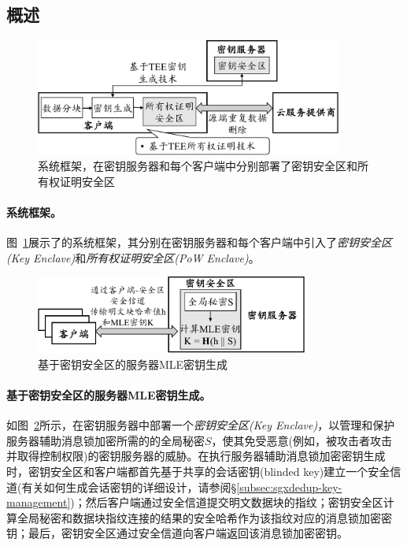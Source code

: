 \subsection{概述}
\label{subsec:sgxdedup-arch}

\begin{figure}[!htb]
  \centering
  \includegraphics[width=0.9\textwidth]{pic/sgxdedup/sgxdedup-arch.pdf}
  \caption{\sysnameS 系统框架，在密钥服务器和每个客户端中分别部署了密钥安全区和所有权证明安全区}
  \label{fig:sgxdedup-overview}
\end{figure}

\paragraph*{\sysnameS 系统框架。}图~\ref{fig:sgxdedup-overview}展示了\sysnameS 的系统框架，其分别在密钥服务器和每个客户端中引入了\textit{密钥安全区(Key Enclave)}和\textit{所有权证明安全区(PoW Enclave)}。 

\begin{figure}[!htb]
  \centering
  \includegraphics[width=0.8\textwidth]{pic/sgxdedup/key-enclave.pdf}
  \caption{基于密钥安全区的服务器MLE密钥生成}
  \label{fig:sgxdedup-overview-key}
\end{figure}

\paragraph*{基于密钥安全区的服务器MLE密钥生成。}如图~\ref{fig:sgxdedup-overview-key}所示，\sysnameS 在密钥服务器中部署一个\textit{密钥安全区(Key Enclave)}，以管理和保护服务器辅助消息锁加密所需的的全局秘密$S$，使其免受恶意(例如，被攻击者攻击并取得控制权限)的密钥服务器的威胁。在执行服务器辅助消息锁加密密钥生成时，密钥安全区和客户端都首先基于共享的会话密钥(blinded key)建立一个安全信道(有关如何生成会话密钥的详细设计，请参阅\S\ref{subsec:sgxdedup-key-management})；然后客户端通过安全信道提交明文数据块的指纹；密钥安全区计算全局秘密和数据块指纹连接的结果的安全哈希作为该指纹对应的消息锁加密密钥；最后，密钥安全区通过安全信道向客户端返回该消息锁加密密钥。

